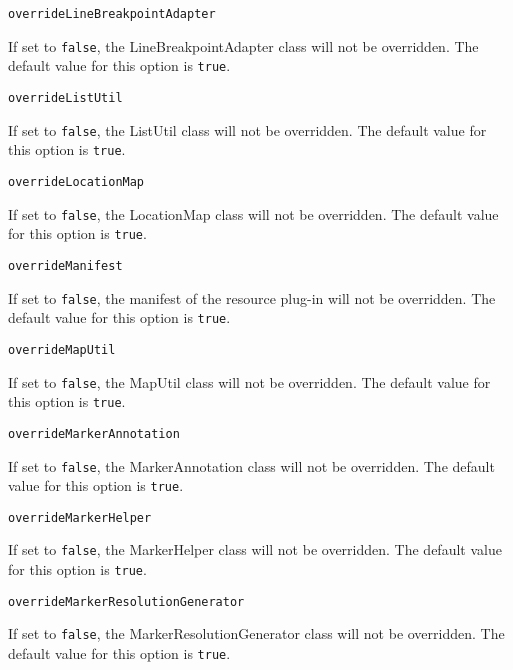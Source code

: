 \noindent\texttt{overrideLineBreakpointAdapter}
\begin{myindentpar}{1cm}
If set to \texttt{false}, the LineBreakpointAdapter class will not be overridden. The default value for this option is \texttt{true}.
\end{myindentpar}

\noindent\texttt{overrideListUtil}
\begin{myindentpar}{1cm}
If set to \texttt{false}, the ListUtil class will not be overridden. The default value for this option is \texttt{true}.
\end{myindentpar}

\noindent\texttt{overrideLocationMap}
\begin{myindentpar}{1cm}
If set to \texttt{false}, the LocationMap class will not be overridden. The default value for this option is \texttt{true}.
\end{myindentpar}

\noindent\texttt{overrideManifest}
\begin{myindentpar}{1cm}
If set to \texttt{false}, the manifest of the resource plug-in will not be overridden. The default value for this option is \texttt{true}.
\end{myindentpar}

\noindent\texttt{overrideMapUtil}
\begin{myindentpar}{1cm}
If set to \texttt{false}, the MapUtil class will not be overridden. The default value for this option is \texttt{true}.
\end{myindentpar}

\noindent\texttt{overrideMarkerAnnotation}
\begin{myindentpar}{1cm}
If set to \texttt{false}, the MarkerAnnotation class will not be overridden. The default value for this option is \texttt{true}.
\end{myindentpar}

\noindent\texttt{overrideMarkerHelper}
\begin{myindentpar}{1cm}
If set to \texttt{false}, the MarkerHelper class will not be overridden. The default value for this option is \texttt{true}.
\end{myindentpar}

\noindent\texttt{overrideMarkerResolutionGenerator}
\begin{myindentpar}{1cm}
If set to \texttt{false}, the MarkerResolutionGenerator class will not be overridden. The default value for this option is \texttt{true}.
\end{myindentpar}


